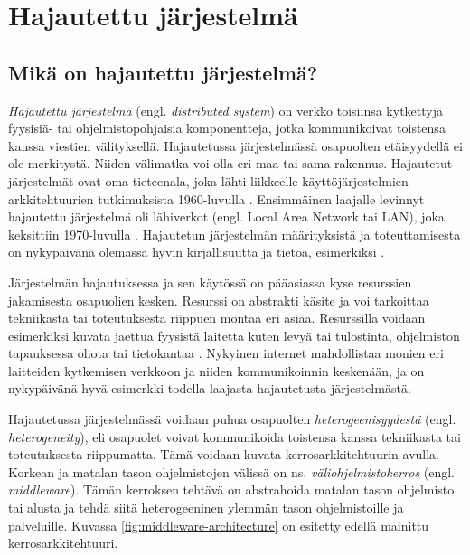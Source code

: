 \chapter{Hajautettu järjestelmä}
\label{ch:distributed-systems}


\section{Mikä on hajautettu järjestelmä?}
\emph{Hajautettu järjestelmä} (engl. \emph{distributed system}) on verkko toisiinsa kytkettyjä fyysisiä- tai ohjelmistopohjaisia komponentteja, jotka kommunikoivat toistensa kanssa viestien välityksellä. Hajautetussa järjestelmässä osapuolten etäisyydellä ei ole merkitystä. Niiden välimatka voi olla eri maa tai sama rakennus. Hajautetut järjestelmät ovat oma tieteenala, joka lähti liikkeelle käyttöjärjestelmien arkkitehtuurien tutkimuksista 1960-luvulla \cite[s.~384]{andrews2000foundations}. Ensimmäinen laajalle levinnyt hajautettu järjestelmä oli lähiverkot (engl. Local Area Network tai LAN), joka keksittiin 1970-luvulla \cite[s.~32]{andrews2000foundations}. Hajautetun järjestelmän määrityksistä ja toteuttamisesta on nykypäivänä olemassa hyvin kirjallisuutta ja tietoa, esimerkiksi \cite{distributed-systems-concepts-and-design, distributed-event-based-systems, mullender1993distributed, baldoni2005distributed}.

Järjestelmän hajautuksessa ja sen käytössä on pääasiassa kyse resurssien jakamisesta osapuolien kesken. Resurssi on abstrakti käsite ja voi tarkoittaa tekniikasta tai toteutuksesta riippuen montaa eri asiaa. Resurssilla voidaan esimerkiksi kuvata jaettua fyysistä laitetta kuten levyä tai tulostinta, ohjelmiston tapauksessa oliota tai tietokantaa \cite[s.~2--3]{distributed-systems-concepts-and-design}. Nykyinen internet mahdollistaa monien eri laitteiden kytkemisen verkkoon ja niiden kommunikoinnin keskenään, ja on nykypäivänä hyvä esimerkki todella laajasta hajautetusta järjestelmästä.

Hajautetussa järjestelmässä voidaan puhua osapuolten \emph{heterogeenisyydestä} (engl. \emph{heterogeneity}), eli osapuolet voivat kommunikoida toistensa kanssa tekniikasta tai toteutuksesta riippumatta. Tämä voidaan kuvata kerrosarkkitehtuurin avulla. Korkean ja matalan tason ohjelmistojen välissä on ns. \emph{väliohjelmistokerros} (engl. \emph{middleware}). Tämän kerroksen tehtävä on abstrahoida matalan tason ohjelmisto tai alusta ja tehdä siitä heterogeeninen ylemmän tason ohjelmistoille ja palveluille. Kuvassa \ref{fig:middleware-architecture} on esitetty edellä mainittu kerrosarkkitehtuuri. \mbox{\cite[s. ~16--17]{distributed-systems-concepts-and-design}} \mbox{\cite[s.~2--3]{distributed-event-based-systems}}

